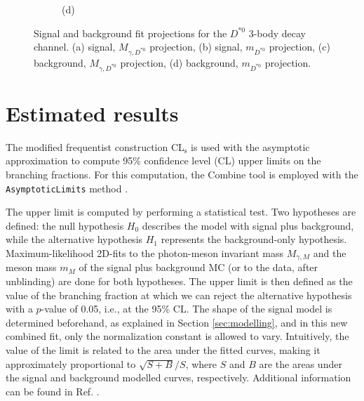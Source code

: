 \begin{figure}[!ht]
\begin{subfigure}[t]{0.50\mylength}
        \caption{\footnotesize (d)}
    \end{subfigure}%
\caption{Signal and background fit projections for the $D^{*0}$ 3-body decay channel. (a) signal, $M_{\gamma, D^{*0}}$ projection, (b) signal, $m_{D^{*0}}$ projection, (c) background, $M_{\gamma, D^{*0}}$ projection, (d) background, $m_{D^{*0}}$ projection.}
\label{fig:sig_bkg_modelling_d0star_3body}
    \vspace*{-0.0cm}
\end{figure}

\section{Estimated results}\label{sec:results}

The modified frequentist construction CL$_\text{s}$ \cite{Read:2002hq, Junk:1999kv} is used with the asymptotic approximation \cite{Cowan:2010js} to compute 95\% confidence level (CL) upper limits on the branching fractions. For this computation, the Combine tool is employed with the \verb+AsymptoticLimits+ method \cite{CMS:Combine}.

The upper limit is computed by performing a statistical test. Two hypotheses are defined: the null hypothesis $H_0$ describes the model with signal plus background, while the alternative hypothesis $H_1$ represents the background-only hypothesis. Maximum-likelihood 2D-fits to the photon-meson invariant mass $M_{\gamma, M}$ and the meson mass $m_{M}$ of the signal plus background MC (or to the data, after unblinding) are done for both hypotheses. The upper limit is then defined as the value of the branching fraction at which we can reject the alternative hypothesis with a $p$-value of 0.05, i.e., at the 95\% CL. The shape of the signal model is determined beforehand, as explained in Section \ref{sec:modelling}, and in this new combined fit, only the normalization constant is allowed to vary. Intuitively, the value of the limit is related to the area under the fitted curves, making it approximately proportional to $\sqrt{S+B}/S$, where $S$ and $B$ are the areas under the signal and background modelled curves, respectively. Additional information can be found in Ref. \cite{Cowan:2010js}.


